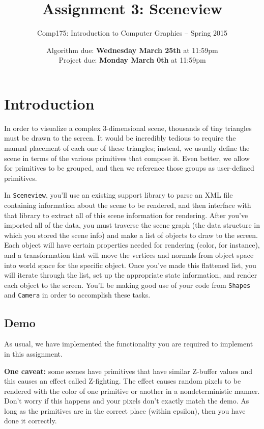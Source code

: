 \documentclass[10pt,twocolumn]{article}
\title{\Huge{\bf Assignment 3: Sceneview}}
\author{Comp175: Introduction to Computer Graphics -- Spring 2015}
\date{Algorithm due:  {\bf Wednesday March 25th} at 11:59pm\\
Project due:  {\bf Monday March 0th} at 11:59pm}
\begin{document}
\maketitle

\section{Introduction}								
In order to visualize a complex 3-dimensional scene, thousands of tiny triangles must be drawn to the screen. It would be incredibly tedious to require the manual placement of each one of these triangles; instead, we usually define the scene in terms of the various primitives that compose it. Even better, we allow for primitives to be grouped, and then we reference those groups as user-defined primitives.

In {\tt Sceneview}, you'll use an existing support library to parse an XML file containing information about the scene to be rendered, and then interface with that library to extract all of this scene information for rendering. After you've imported all of the data, you must traverse the scene graph (the data structure in which you stored the scene info) and make a list of objects to draw to the screen. Each object will have certain properties needed for rendering (color, for instance), and a transformation that will move the vertices and normals from object space into world space for the specific object. Once you've made this flattened list, you will iterate through the list, set up the appropriate state information, and render each object to the screen. You'll be making good use of your code from {\tt Shapes} and {\tt Camera} in order to accomplish these tasks.

\subsection{Demo}
As usual, we have implemented the functionality you are required to implement in this assignment.

{\bf One caveat:} some scenes have primitives that have similar Z-buffer values and this causes an effect called Z-fighting. The effect causes random pixels to be rendered with the color of one primitive or another in a nondeterministic manner. Don't worry if this happens and your pixels don't exactly match the demo. As long as the primitives are in the correct place (within epsilon), then you have done it correctly.
\end{document}
